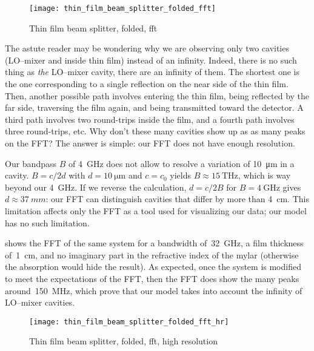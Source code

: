 \begin{figure}[hbtp]
    \centering
    \texttt{[image: thin\_film\_beam\_splitter\_folded\_fft]}
    \caption{Thin film beam splitter, folded, fft}
    \label{fig:thin_film_beam_splitter_folded_fft}
\end{figure}

The astute reader may be wondering why we are observing only two cavities (LO--mixer and inside thin film) instead of an infinity.
Indeed, there is no such thing as \textit{the} LO--mixer cavity, there are an infinity of them.
The shortest one is the one corresponding to a single reflection on the near side of the thin film.
Then, another possible path involves entering the thin film, being reflected by the far side, traversing the film again, and being transmitted toward the detector.
A third path involves two round-trips inside the film, and a fourth path involves three round-trips, etc.
Why don't these many cavities show up as as many peaks on the FFT?
The answer is simple: our FFT does not have enough resolution.

Our bandpass $B$ of \SI{4}{\giga\hertz} does not allow to resolve a variation of \SI{10}{\micro\meter} in a cavity.
$B = c / 2d$ with $d=\SI{10}{\micro\meter}$ and $c=c_0$ yields $B \approx \SI{15}{\tera\hertz}$, which is way beyond our \SI{4}{\giga\hertz}.
If we reverse the calculation, $d=c/2B$ for $B=\SI{4}{\giga\hertz}$ gives $d \approx \SI{37}{mm}$: our FFT can distinguish cavities that differ by more than \SI{4}{\centi\meter}.
This limitation affects only the FFT as a tool used for visualizing our data; our model has no such limitation.

 shows the FFT of the same system for a bandwidth of~\SI{32}{\giga\hertz}, a film thickness of~\SI{1}{\centi\meter}, and no imaginary part in the refractive index of the mylar (otherwise the absorption would hide the result).
As expected, once the system is modified to meet the expectations of the FFT, then the FFT does show the many peaks around~\SI{150}{\mega\hertz}, which prove that our model takes into account the infinity of LO--mixer cavities.

\begin{figure}[hbtp]
    \centering
    \texttt{[image: thin\_film\_beam\_splitter\_folded\_fft\_hr]}
    \caption{Thin film beam splitter, folded, fft, high resolution}
    \label{fig:thin_film_beam_splitter_folded_fft_hr}
\end{figure}
